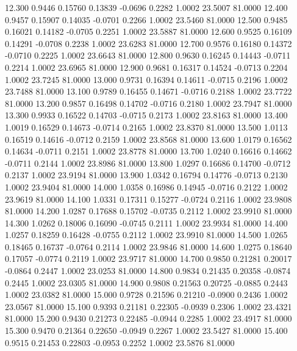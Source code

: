   12.300   0.9446   0.15760   0.13839  -0.0696   0.2282   1.0002  23.5007  81.0000
  12.400   0.9457   0.15907   0.14035  -0.0701   0.2266   1.0002  23.5460  81.0000
  12.500   0.9485   0.16021   0.14182  -0.0705   0.2251   1.0002  23.5887  81.0000
  12.600   0.9525   0.16109   0.14291  -0.0708   0.2238   1.0002  23.6283  81.0000
  12.700   0.9576   0.16180   0.14372  -0.0710   0.2225   1.0002  23.6643  81.0000
  12.800   0.9630   0.16245   0.14443  -0.0711   0.2214   1.0002  23.6965  81.0000
  12.900   0.9681   0.16317   0.14524  -0.0713   0.2204   1.0002  23.7245  81.0000
  13.000   0.9731   0.16394   0.14611  -0.0715   0.2196   1.0002  23.7488  81.0000
  13.100   0.9789   0.16455   0.14671  -0.0716   0.2188   1.0002  23.7722  81.0000
  13.200   0.9857   0.16498   0.14702  -0.0716   0.2180   1.0002  23.7947  81.0000
  13.300   0.9933   0.16522   0.14703  -0.0715   0.2173   1.0002  23.8163  81.0000
  13.400   1.0019   0.16529   0.14673  -0.0714   0.2165   1.0002  23.8370  81.0000
  13.500   1.0113   0.16519   0.14616  -0.0712   0.2159   1.0002  23.8568  81.0000
  13.600   1.0179   0.16562   0.14634  -0.0711   0.2151   1.0002  23.8778  81.0000
  13.700   1.0240   0.16616   0.14662  -0.0711   0.2144   1.0002  23.8986  81.0000
  13.800   1.0297   0.16686   0.14700  -0.0712   0.2137   1.0002  23.9194  81.0000
  13.900   1.0342   0.16794   0.14776  -0.0713   0.2130   1.0002  23.9404  81.0000
  14.000   1.0358   0.16986   0.14945  -0.0716   0.2122   1.0002  23.9619  81.0000
  14.100   1.0331   0.17311   0.15277  -0.0724   0.2116   1.0002  23.9808  81.0000
  14.200   1.0287   0.17688   0.15702  -0.0735   0.2112   1.0002  23.9910  81.0000
  14.300   1.0262   0.18006   0.16090  -0.0745   0.2111   1.0002  23.9934  81.0000
  14.400   1.0257   0.18259   0.16428  -0.0755   0.2112   1.0002  23.9910  81.0000
  14.500   1.0265   0.18465   0.16737  -0.0764   0.2114   1.0002  23.9846  81.0000
  14.600   1.0275   0.18640   0.17057  -0.0774   0.2119   1.0002  23.9717  81.0000
  14.700   0.9850   0.21281   0.20017  -0.0864   0.2447   1.0002  23.0253  81.0000
  14.800   0.9834   0.21435   0.20358  -0.0874   0.2445   1.0002  23.0305  81.0000
  14.900   0.9808   0.21563   0.20725  -0.0885   0.2443   1.0002  23.0382  81.0000
  15.000   0.9728   0.21596   0.21210  -0.0900   0.2436   1.0002  23.0567  81.0000
  15.100   0.9393   0.21181   0.22305  -0.0939   0.2306   1.0002  23.4321  81.0000
  15.200   0.9430   0.21273   0.22485  -0.0944   0.2285   1.0002  23.4917  81.0000
  15.300   0.9470   0.21364   0.22650  -0.0949   0.2267   1.0002  23.5427  81.0000
  15.400   0.9515   0.21453   0.22803  -0.0953   0.2252   1.0002  23.5876  81.0000
